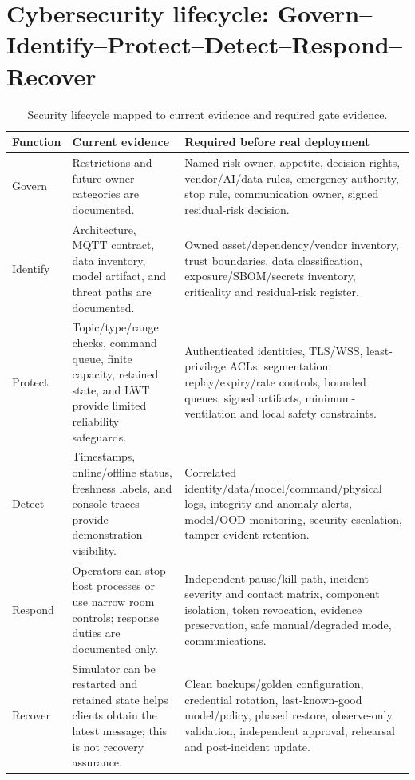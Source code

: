 \section{Cybersecurity lifecycle: Govern--Identify--Protect--Detect--Respond--Recover}
\begin{table}[H]
\centering
\caption{Security lifecycle mapped to current evidence and required gate evidence.}
\label{tab:gipdrr}
\begin{tabularx}{\textwidth}{L{0.12\textwidth}Y Y}
\toprule
Function & Current evidence & Required before real deployment\\
\midrule
Govern & Restrictions and future owner categories are documented. & Named risk owner, appetite, decision rights, vendor/AI/data rules, emergency authority, stop rule, communication owner, signed residual-risk decision.\\
Identify & Architecture, MQTT contract, data inventory, model artifact, and threat paths are documented. & Owned asset/dependency/vendor inventory, trust boundaries, data classification, exposure/SBOM/secrets inventory, criticality and residual-risk register.\\
Protect & Topic/type/range checks, command queue, finite capacity, retained state, and LWT provide limited reliability safeguards. & Authenticated identities, TLS/WSS, least-privilege ACLs, segmentation, replay/expiry/rate controls, bounded queues, signed artifacts, minimum-ventilation and local safety constraints.\\
Detect & Timestamps, online/offline status, freshness labels, and console traces provide demonstration visibility. & Correlated identity/data/model/command/physical logs, integrity and anomaly alerts, model/OOD monitoring, security escalation, tamper-evident retention.\\
Respond & Operators can stop host processes or use narrow room controls; response duties are documented only. & Independent pause/kill path, incident severity and contact matrix, component isolation, token revocation, evidence preservation, safe manual/degraded mode, communications.\\
Recover & Simulator can be restarted and retained state helps clients obtain the latest message; this is not recovery assurance. & Clean backups/golden configuration, credential rotation, last-known-good model/policy, phased restore, observe-only validation, independent approval, rehearsal and post-incident update.\\
\bottomrule
\end{tabularx}
\end{table}

